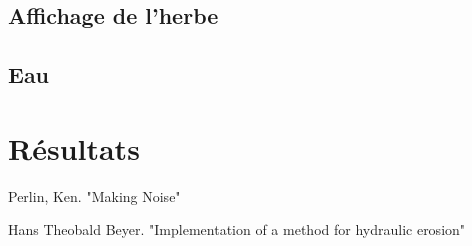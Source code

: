 \documentclass[11pt]{article} %
\begin{document}

\subsection{Affichage de l'herbe}

\subsection{Eau}



\section{Résultats}




\begin{thebibliography}{9}
Perlin, Ken. "Making Noise"

Hans Theobald Beyer. "Implementation of a method for hydraulic erosion"
\end{thebibliography}

\listoffigures
\end{document}
